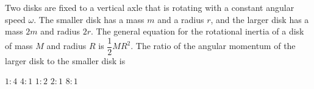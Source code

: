 \documentclass{../../oss-apphys-exam}
\begin{document}
\begin{multicols*}{2}
\begin{questions}
    
    \question Two disks are fixed to a vertical axle that is rotating with a
    constant angular speed $\omega$. The smaller disk has a mass $m$ and a
    radius $r$, and the larger disk has a mass $2m$ and radius $2r$. The
    general equation for the rotational inertia of a disk of mass $M$ and
    radius $R$ is $\dfrac12MR^2$. The ratio of the angular momentum of the
    larger disk to the smaller disk is
    \begin{choices}
      \choice $1:4$
      \choice $4:1$
      \choice $1:2$
      \choice $2:1$
      \choice $8:1$
    \end{choices}


\end{questions}
\end{multicols*}
\end{document}
